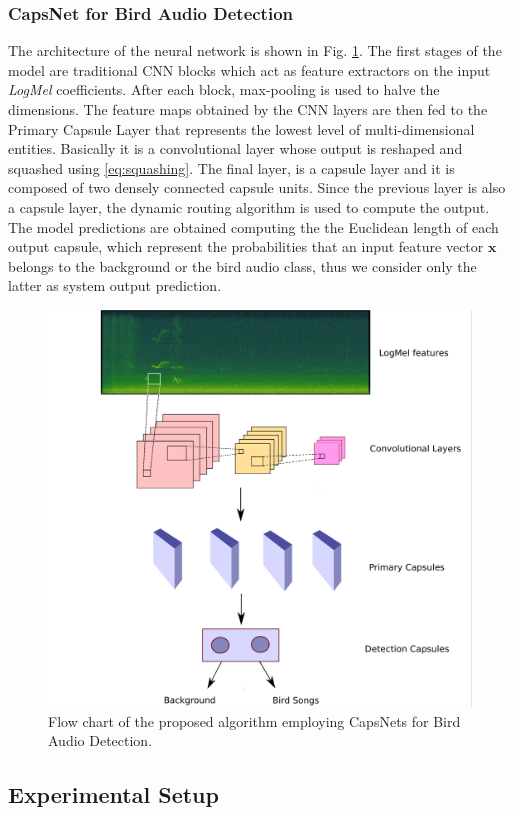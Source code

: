 \subsubsection{CapsNet for Bird Audio Detection}
The architecture of the neural network is shown in Fig. \ref{fig:flowchart_capsule_bad}. The first stages of the model are traditional CNN blocks which act as feature extractors on the input \textit{LogMel} coefficients.
After each block, max-pooling is used to halve the dimensions. The feature maps obtained by the CNN layers are then fed to the Primary Capsule Layer that represents the lowest level of multi-dimensional entities. Basically it is a convolutional layer whose output is reshaped and squashed using \eqref{eq:squashing}. The final layer, is a capsule layer and it is composed of two densely connected capsule units.
Since the previous layer is also a capsule layer, the dynamic routing algorithm is used to compute the output. The model predictions are obtained computing the the Euclidean length of each
output capsule, which represent the probabilities that an input feature vector $\mathbf{x}$ belongs to the background or the bird audio class, thus we consider only the latter as system output prediction.

\begin{figure}[htbp]
	\centering
	\includegraphics[width=0.6\columnwidth]{img/capsule_for_bad}
	\caption[CapsNet for Bird Audio Detection]{Flow chart of the proposed algorithm employing CapsNets for Bird Audio Detection.}
	\label{fig:flowchart_capsule_bad}
\end{figure}

\subsection{Experimental Setup}
\label{sec:experiment}

